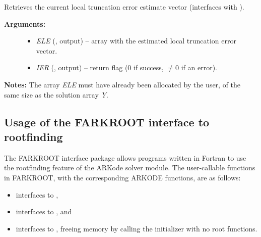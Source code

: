 \documentclass[letterpaper,10pt,english]{sphinxmanual}
\begin{document}
\begin{fulllineitems}
\label{f_interface/Optional_output:f/_/FARKGETESTLOCALERR}
Retrieves the current local truncation error estimate
vector (interfaces with {\hyperref[c_interface/User_callable:ARKodeGetEstLocalErrors]{}}).
\begin{description}
\item[{\textbf{Arguments:}}] \leavevmode\begin{itemize}
\item {} 
\emph{ELE} (, output) -- array with the estimated local
truncation error vector.

\item {} 
\emph{IER}  (, output) -- return flag  (0 if success,
$\ne 0$ if an error).

\end{itemize}

\end{description}

\textbf{Notes:}
The array \emph{ELE} must have already been allocated by the user, of
the same size as the solution array \emph{Y}.

\end{fulllineitems}



\subsection{Usage of the FARKROOT interface to rootfinding}
\label{f_interface/Rootfinding:usage-of-the-farkroot-interface-to-rootfinding}\label{f_interface/Rootfinding::doc}\label{f_interface/Rootfinding:finterface-rootfinding}
The FARKROOT interface package allows programs written in Fortran to
use the rootfinding feature of the ARKode solver module. The
user-callable functions in FARKROOT, with the corresponding ARKODE
functions, are as follows:
\begin{itemize}
\item {} 
{\hyperref[f_interface/Rootfinding:f/_/FARKROOTINIT]{}} interfaces to {\hyperref[c_interface/User_callable:ARKodeRootInit]{}},

\item {} 
{\hyperref[f_interface/Rootfinding:f/_/FARKROOTINFO]{}} interfaces to
{\hyperref[c_interface/User_callable:ARKodeGetRootInfo]{}}, and

\item {} 
{\hyperref[f_interface/Rootfinding:f/_/FARKROOTFREE]{}} interfaces to {\hyperref[c_interface/User_callable:ARKodeRootInit]{}},
freeing memory by calling the initializer with no root functions.

\end{itemize}
\end{document}
